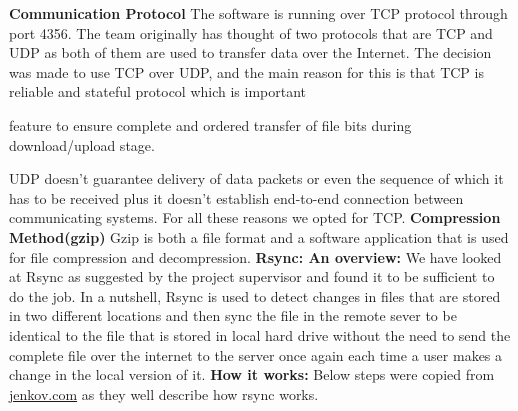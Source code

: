 \documentclass{article}
\begin{document}
\hfill \break
\textbf{Communication Protocol}
The software is running over TCP protocol through port 4356. The team originally has thought of two protocols that are TCP and UDP as both of them are used to transfer data over the Internet. The decision was made to use TCP over UDP, and the main reason for this is that TCP is reliable and stateful protocol which is important

feature to ensure complete and ordered transfer of file bits during download/upload stage.

UDP doesn’t guarantee delivery of data packets or even the sequence of which it has to be received plus it doesn’t establish end-to-end connection between communicating systems. For all these reasons we opted for TCP.
\newline
\hfill \break
\textbf{Compression Method(gzip)}
Gzip is both a file format and a software application that is used for file compression and decompression.
\textbf{Rsync: An overview:} We have looked at Rsync as suggested by the project supervisor and found it to be sufficient to do the job. In a nutshell, Rsync is used to detect changes in files that are stored in two different locations and then sync the file in the remote sever to be identical to the file that is stored in local hard drive without the need to send the complete file over the internet to the server once again each time a user makes a change in the local version of it.
\newline
\hfill \break
\textbf{How it works:}
Below steps were copied from \underline{jenkov.com} as they well describe how rsync works.
\end{document}
